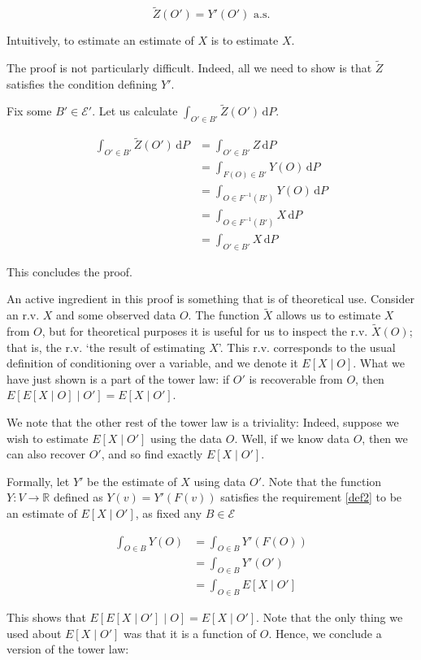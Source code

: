 \documentclass{article}
\let\mathbbalt\mathbb
\let\mathbb\mathbbalt
\newcommand{\E}{\mathcal{E}}
\newcommand{\R}{\mathbb{R}}
\newcommand{\dd}{\,\mathrm{d}}
\begin{document}
	\[\tilde Z(O') = Y'(O') \text{ a.s.}\]
	
	Intuitively, to estimate an estimate of $X$ is to estimate $X$.
	
	The proof is not particularly difficult. Indeed, all we need to show is that $\tilde Z$ satisfies the condition defining $Y'$.
	
	Fix some $B' \in \E'$. Let us calculate $\int_{O' \in B'} \tilde Z(O') \dd P$.
	
	\begin{align*}
	\int_{O' \in B'} \tilde Z(O') \dd P &= \int_{O' \in B'} Z \dd P\\
	&= \int_{F(O) \in B'} Y(O) \dd P\\
	&= \int_{O \in F^{-1}(B')} Y(O) \dd P\\
	&= \int_{O \in F^{-1}(B')} X \dd P\\
	&= \int_{O' \in B'} X \dd P
	\end{align*}
	
	This concludes the proof.
	
	An active ingredient in this proof is something that is of theoretical use. Consider an r.v. $X$ and some observed data $O$. The function $\tilde X$ allows us to estimate $X$ from $O$, but for theoretical purposes it is useful for us to inspect the r.v. $\tilde X(O)$; that is, the r.v. `the result of estimating $X$'. This r.v. corresponds to the usual definition of conditioning over a variable, and we denote it $E[X \mid O]$. What we have just shown is a part of the tower law: if $O'$ is recoverable from $O$, then $E[ E[X \mid O] \mid O'] = E[X \mid O']$.
	
	We note that the other rest of the tower law is a triviality: Indeed, suppose we wish to estimate $E[X \mid O']$ using the data $O$. Well, if we know data $O$, then we can also recover $O'$, and so find exactly $E[X \mid O']$.
	
	Formally, let $Y'$ be the estimate of $X$ using data $O'$. Note that the function $Y : V \to \R$ defined as $Y(v) = Y'(F(v))$ satisfies the requirement \eqref{def2} to be an estimate of $E[X \mid O']$, as fixed any $B \in \E$
	
	\begin{align*}
	\int_{O \in B} Y(O) &= \int_{O \in B} Y'(F(O))\\
	&= \int_{O \in B} Y'(O')\\
	&= \int_{O \in B} E[X \mid O']
	\end{align*}
	
	This shows that $E[E[X \mid O'] \mid O] = E[X \mid O']$. Note that the only thing we used about $E[X \mid O']$ was that it is a function of $O$. Hence, we conclude a version of the tower law:
	
\end{document}
